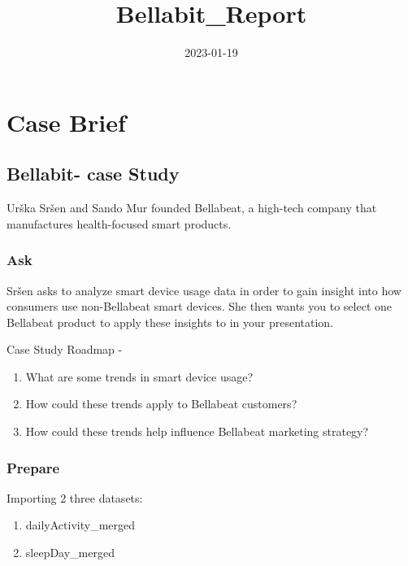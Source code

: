 \documentclass[
]{article}
\title{Bellabit\_Report}
\author{}
\date{\vspace{-2.5em}2023-01-19}
\begin{document}
\maketitle

\hypertarget{case-brief}{%
\section{Case Brief}\label{case-brief}}

\hypertarget{bellabit--case-study}{%
\subsection{Bellabit- case Study}\label{bellabit--case-study}}

Urška Sršen and Sando Mur founded Bellabeat, a high-tech company that
manufactures health-focused smart products.

\hypertarget{ask}{%
\subsubsection{Ask}\label{ask}}

Sršen asks to analyze smart device usage data in order to gain insight
into how consumers use non-Bellabeat smart devices. She then wants you
to select one Bellabeat product to apply these insights to in your
presentation.

Case Study Roadmap -

\begin{enumerate}
\def\labelenumi{\arabic{enumi}.}
\item
  What are some trends in smart device usage?
\item
  How could these trends apply to Bellabeat customers?
\item
  How could these trends help influence Bellabeat marketing strategy?
\end{enumerate}

\hypertarget{prepare}{%
\subsubsection{Prepare}\label{prepare}}

Importing 2 three datasets:

\begin{enumerate}
\def\labelenumi{\arabic{enumi}.}
\item
  dailyActivity\_merged
\item
  sleepDay\_merged
\end{enumerate}
\end{document}
